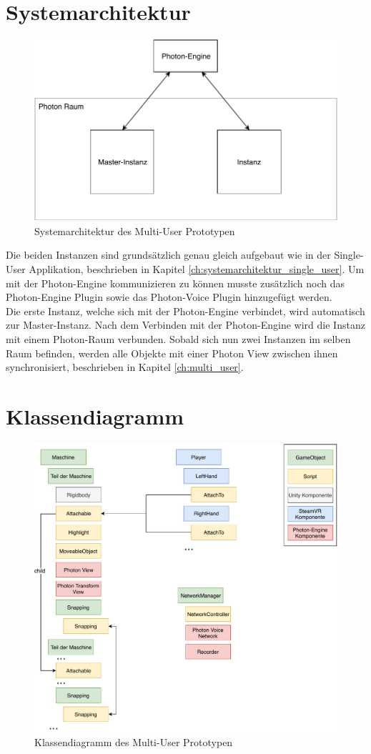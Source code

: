 \section{Systemarchitektur}
\begin{figure}[h!]
	\centering
	\includegraphics[keepaspectratio,width=0.60\linewidth]{img/ArchitekturT2.pdf}
	\caption{Systemarchitektur des Multi-User Prototypen}
	\label{fig:systemarchitektur_mutli_user}
\end{figure}

Die beiden Instanzen sind grundsätzlich genau gleich aufgebaut wie in der Single-User Applikation, beschrieben in Kapitel \ref{ch:systemarchitektur_single_user}. Um mit der Photon-Engine kommunizieren zu können musste zusätzlich noch das Photon-Engine Plugin sowie das Photon-Voice Plugin hinzugefügt werden. \\
Die erste Instanz, welche sich mit der Photon-Engine verbindet, wird automatisch zur Master-Instanz. Nach dem Verbinden mit der Photon-Engine wird die Instanz mit einem Photon-Raum verbunden. Sobald sich nun zwei Instanzen im selben Raum befinden, werden alle Objekte mit einer Photon View zwischen ihnen synchronisiert, beschrieben in Kapitel \ref{ch:multi_user}.

\section{Klassendiagramm}

\begin{figure}[h!]
	\centering
	\includegraphics[keepaspectratio,width=0.65\linewidth]{img/Klassendiagramm_T2.pdf}
	\caption{Klassendiagramm des Multi-User Prototypen}
	\label{fig:klassendiagramm_multi_user}
\end{figure}


